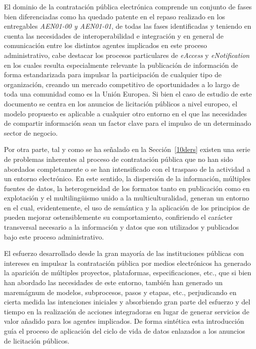 El dominio de la contratación pública electrónica comprende un conjunto de fases bien diferenciadas 
como ha quedado patente en el repaso realizado en los entregables \textit{AEN01-00 y AEN01-01}, de todas las 
fases identificadas y teniendo en cuenta las necesidades de interoperabilidad e integración y en general 
de comunicación entre los distintos agentes implicados en este proceso administrativo, cabe destacar 
los procesos particulares de \textit{eAccess} y \textit{eNotification} en los cuales resulta 
especialmente relevante la publicación de información de forma estandarizada para impulsar 
la participación de cualquier tipo de organización, creando un mercado competitivo de oportunidades 
a lo largo de toda una comunidad como es la Unión Europea. Si bien el caso de estudio de este documento 
se centra en los anuncios de licitación públicos a nivel europeo, el modelo propuesto es aplicable a 
cualquier otro entorno en el que las necesidades de compartir información sean un factor clave 
para el impulso de un determinado sector de negocio.

Por otra parte, tal y como se ha señalado en la Sección~\ref{10ders} existen una serie de problemas 
inherentes al proceso de contratación pública que no han sido abordados completamente o 
se han intensificado con el traspaso de la actividad a un entorno electrónico. En este sentido, 
la dispersión de la información, múltiples fuentes de datos, la heterogeneidad de los formatos tanto 
en publicación como en explotación y el multiling\"{u}ismo unido a la multiculturalidad, generan un entorno 
en el cual, evidentemente, el uso de semántica y la aplicación de los principios de \linkeddata pueden 
mejorar ostensiblemente su comportamiento, confiriendo el carácter transversal necesario a la información 
y datos que son utilizados y publicados bajo este proceso administrativo.

El esfuerzo desarrollado desde la gran mayoría de las instituciones públicas con intereses 
en impulsar la contratación pública por medios electrónicos ha generado la aparición de múltiples proyectos, 
plataformas, especificaciones, etc., que si bien han abordado las necesidades de este entorno, también 
han generado un maremágnum de modelos, subprocesos, pasos y etapas, etc., perjudicando en cierta medida 
las intenciones iniciales y absorbiendo gran parte del esfuerzo y del tiempo en la realización de 
acciones integradoras en lugar de generar servicios de valor añadido para los agentes 
implicados. De forma sintética esta introducción guía el proceso de aplicación del ciclo de vida 
de datos enlazados a los anuncios de licitación públicos.

